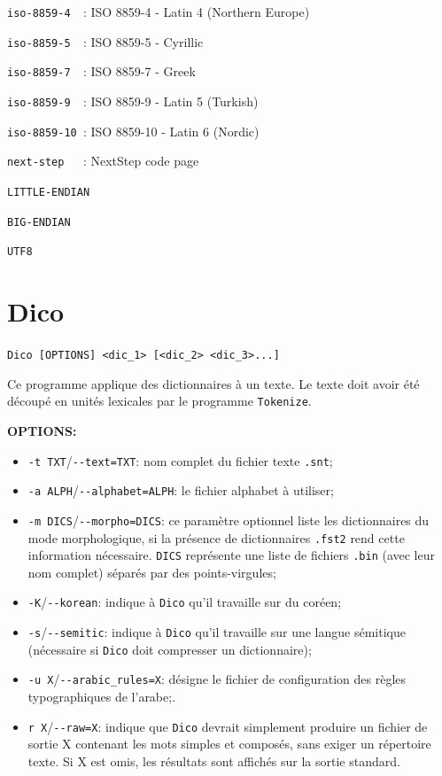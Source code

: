 \verb$iso-8859-4  $: ISO 8859-4  - Latin 4 (Northern Europe)

\verb$iso-8859-5  $: ISO 8859-5  - Cyrillic

\verb$iso-8859-7  $: ISO 8859-7  - Greek

\verb$iso-8859-9  $: ISO 8859-9  - Latin 5 (Turkish)

\verb$iso-8859-10 $: ISO 8859-10 - Latin 6 (Nordic)

\verb$next-step   $: NextStep code page

\verb$LITTLE-ENDIAN$

\verb$BIG-ENDIAN$

\verb$UTF8$







\section{Dico}
\verb+Dico [OPTIONS] <dic_1> [<dic_2> <dic_3>...]+

\bigskip
\noindent Ce programme applique des dictionnaires à un texte. Le texte doit avoir été découpé en
unités lexicales par le programme \verb+Tokenize+.

\bigskip
\noindent \textbf{OPTIONS:}
\begin{itemize}
\item \verb+-t TXT+/\verb+--text=TXT+: nom complet du fichier texte \verb+.snt+;
\item \verb+-a ALPH+/\verb+--alphabet=ALPH+: le fichier alphabet à utiliser;
\item \verb+-m DICS+/\verb+--morpho=DICS+: ce paramètre optionnel liste
	les dictionnaires du mode morphologique, si la présence de dictionnaires
	\verb+.fst2+ rend cette information nécessaire. \verb+DICS+ représente une liste de fichiers \verb+.bin+ (avec leur nom
		complet) séparés par des points-virgules;
\item \verb+-K+/\verb+--korean+: indique à \verb$Dico$ qu'il travaille sur du coréen;
\item \verb+-s+/\verb+--semitic+: indique à \verb$Dico$ qu'il travaille sur une langue sémitique
	(nécessaire  si \verb$Dico$ doit compresser un dictionnaire);
\item \verb+-u X+/\verb+--arabic_rules=X+: désigne le fichier de configuration des règles
	typographiques de l'arabe;.
\item \verb+r X+/\verb+--raw=X+: indique que \verb$Dico$ devrait simplement produire un fichier de
	sortie X contenant les mots simples et composés, sans exiger un répertoire texte. Si X est
	omis, les résultats sont affichés sur la sortie standard.
\end{itemize}

